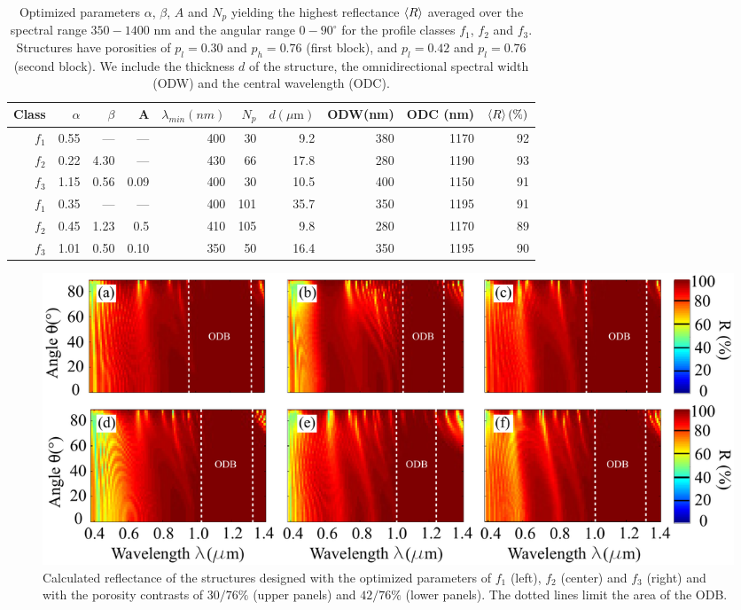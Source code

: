 \documentclass[a4paper,fleqn]{cas-sc}
\begin{document}
\begin{table}[!ht]
  \centering
  \label{tab:tableA}
  \addtolength{\tabcolsep}{-2pt}
    \begin{tabular}{rrrrrrrrrr}
      Class&$\alpha$&$\beta$&A&$\lambda_{min}(nm)$&$N_{p}$&$d(\mu\text{m})$       &ODW(nm)&ODC (nm)&$\braket{R}(\%)$\\
      \hline
      \hline
      $f_{1}$     &0.55    &---      &---     &400&30   &9.2    
      &380    &1170    &92\\
      $f_{2}$     &0.22    &4.30     &---     &430&66   &17.8
      &280    &1190    &93\\
      $f_{3}$     & 1.15   &0.56   & 0.09    &400&30   & 10.5
      & 400& 1150& 91\\
      \hline
      $f_{1}$     & 0.35    & ---  & ---     &400&101    & 35.7
      &350& 1195& 91\\
      $f_{2}$     &0.45    &1.23     &0.5  &410  &105   &9.8     &280    &1170    &89\\
      $f_{3}$     &1.01    &0.50     &0.10  &350  &50   &16.4    &350    &1195    &90\\
    \end{tabular}
  \caption{Optimized parameters $\alpha$, $\beta$, $A$ and $N_p$ yielding the highest
    reflectance $\braket{R}$ averaged over the spectral range $350-1400$ nm and
    the angular range $0-90^\circ$ for the profile classes $f_1$, $f_2$ and
    $f_3$. Structures have porosities of $p_l=0.30$ and $p_h=0.76$ (first block), and $p_l=0.42$ and $p_l=0.76$ (second block). We include the thickness $d$ of the structure, the omnidirectional spectral width (ODW) and the central wavelength (ODC).}
\end{table}

\begin{figure}[!ht]
	\begin{center}
		\includegraphics[width=\textwidth]
		{FigureS1.pdf}
	\end{center}
	\caption{Calculated reflectance of the structures designed with the optimized parameters of $f_{1}$ (left), $f_{2}$ (center) and $f_{3}$ (right) and with the porosity contrasts of $30/76\%$ (upper panels) and $42/76\%$ (lower panels). The dotted lines limit the area of the ODB.}
	\label{Fig2}
\end{figure}
\end{document}
